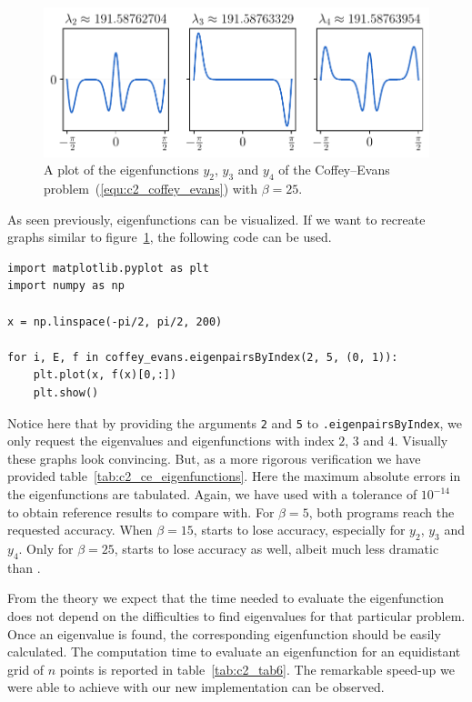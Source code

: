\begin{figure}
    \begin{center}
        \includegraphics[width=1\textwidth]{img/chapter2/pyslise_test/coffey_evans_eigenfunctions.pdf}
    \end{center}
    \caption{A plot of the eigenfunctions $y_2$, $y_3$ and $y_4$ of the Coffey--Evans problem~(\ref{equ:c2_coffey_evans}) with $\beta=25$.}\label{fig:coffey_evans_eigenfunctions}
\end{figure}

As seen previously, eigenfunctions can be visualized. If we want to recreate graphs similar to figure~\ref{fig:coffey_evans_eigenfunctions}, the following code can be used.
\begin{verbatim}
import matplotlib.pyplot as plt
import numpy as np

x = np.linspace(-pi/2, pi/2, 200)

for i, E, f in coffey_evans.eigenpairsByIndex(2, 5, (0, 1)):
    plt.plot(x, f(x)[0,:])
    plt.show()
\end{verbatim}
Notice here that by providing the arguments \texttt{2} and \texttt{5} to \texttt{.eigenpairsByIndex}, we only request the eigenvalues and eigenfunctions with index $2$, $3$ and $4$. Visually these graphs look convincing. But, as a more rigorous verification we have provided table~\ref{tab:c2_ce_eigenfunctions}. Here the maximum absolute errors in the eigenfunctions are tabulated. Again, we have used  with a tolerance of $10^{-14}$ to obtain reference results to compare with. For $\beta = 5$, both programs reach the requested accuracy. When $\beta=15$,  starts to lose accuracy, especially for $y_2$, $y_3$ and $y_4$. Only for $\beta = 25$, starts \pyslise{} to lose accuracy as well, albeit much less dramatic than .

From the theory we expect that the time needed to evaluate the eigenfunction does not depend on the difficulties to find eigenvalues for that particular problem. Once an eigenvalue is found, the corresponding eigenfunction should be easily calculated. The computation time to evaluate an eigenfunction for an equidistant grid of $n$ points is reported in table~\ref{tab:c2_tab6}. The remarkable speed-up we were able to achieve with our new implementation can be observed.

